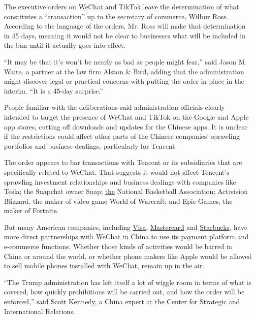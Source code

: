 The executive orders on WeChat and TikTok leave the determination of
what constitutes a ``transaction'' up to the secretary of commerce,
Wilbur Ross. According to the language of the orders, Mr. Ross will make
that determination in 45 days, meaning it would not be clear to
businesses what will be included in the ban until it actually goes into
effect.

``It may be that it's won't be nearly as bad as people might fear,''
said Jason M. Waite, a partner at the law firm Alston \& Bird, adding
that the administration might discover legal or practical concerns with
putting the order in place in the interim. ``It is a 45-day surprise.''

People familiar with the deliberations said administration officials
clearly intended to target the presence of WeChat and TikTok on the
Google and Apple app stores, cutting off downloads and updates for the
Chinese apps. It is unclear if the restrictions could affect other parts
of the Chinese companies' sprawling portfolios and business dealings,
particularly for Tencent.

The order appears to bar transactions with Tencent or its subsidiaries
that are specifically related to WeChat. That suggests it would not
affect Tencent's sprawling investment relationships and business
dealings with companies like Tesla; the Snapchat owner Snap;
\href{https://www.nba.com/article/2019/07/28/nba-tencent-announce-partnership-expansion-release}{the}
National Basketball Association; Activision Blizzard, the maker of video
game World of Warcraft; and Epic Games, the maker of Fortnite.

But many American companies, including
\href{https://usa.visa.com/about-visa/newsroom/press-releases.releaseId.16681.html}{Visa},
\href{https://newsroom.mastercard.com/asia-pacific/press-releases/mastercard-works-with-tencent-and-ant-financial-to-enable-new-payments-choices-across-china-for-international-visitors/}{Mastercard}
and
\href{https://stories.starbucks.com/stories/2016/starbucks-tencent-partnership/}{Starbucks},
have more direct partnerships with WeChat in China to use its payment
platform and e-commerce functions. Whether those kinds of activities
would be barred in China or around the world, or whether phone makers
like Apple would be allowed to sell mobile phones installed with WeChat,
remain up in the air.

``The Trump administration has left itself a lot of wiggle room in terms
of what is covered, how quickly prohibitions will be carried out, and
how the order will be enforced,'' said Scott Kennedy, a China expert at
the Center for Strategic and International Relations.

